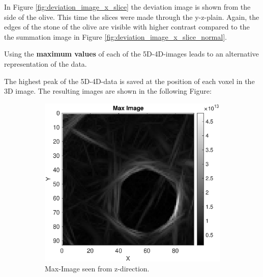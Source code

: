 In Figure \ref{fig:deviation_image_x_slice} the deviation image is shown from the side of the olive. This time the slices were made through the y-z-plain. Again, the edges of the stone of the olive are visible with higher contrast compared to the the summation image in Figure \ref{fig:deviation_image_x_slice_normal}. 


\bigskip
\bigskip



Using the \textbf{maximum values} of each of the 5D-4D-images leads to an alternative representation of the data. 

The highest peak of the 5D-4D-data is saved at the position of each voxel in the 3D image. The resulting images are shown in the following Figure:


\begin{figure}[H]
        \centering
    \begin{subfigure}[b]{0.61\textwidth}
         \centering
         \includegraphics[width=1.13\textwidth]{Graphics/Results/Variance_Image/Max_Ortho_slice_87.eps}
         \caption{Max-Image seen from z-direction. }
         \label{fig:max_image_z-direct}
     \end{subfigure}
     \hfill
    \begin{subfigure}[b]{0.61\textwidth}
        \centering

\end{subfigure}
\end{figure}
